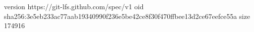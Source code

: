 version https://git-lfs.github.com/spec/v1
oid sha256:3e5eb233ac77aab19340990f236e5be42ce8f30f470ffbee13d2ce67eefce55a
size 174916

